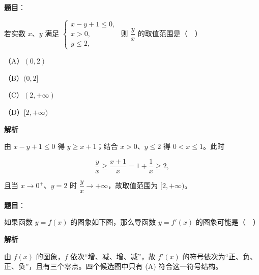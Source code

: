 \begin{answer}

\textbf{题目}：

若实数 $x$、$y$ 满足 $\begin{cases}x-y+1\leqslant0,\\ x>0,\\ y\leqslant2,\end{cases}$ 则 $\dfrac yx$ 的取值范围是（　）

（A）$(0,2)$

（B）$(0,2]$

（C）$(2,+\infty)$

（D）$[2,+\infty)$

\textbf{解析}

由 $x-y+1\leqslant0$ 得 $y\geqslant x+1$；结合 $x>0$、$y\leqslant2$ 得 $0<x\leqslant1$。此时

\nopagebreak[4]
\[\frac yx\geqslant\frac{x+1}x=1+\frac1x\geqslant2,\]

且当 $x\to0^+$、$y=2$ 时 $\dfrac yx\to+\infty$，故取值范围为 $[2,+\infty)$。


\end{answer}
\begin{answer}

\textbf{题目}：

如果函数 $y=f(x)$ 的图象如下图，那么导函数 $y=f'(x)$ 的图象可能是（　）
\nopagebreak[4]
\begin{center}\end{center}
\nopagebreak[4]
\textbf{解析}

由 $f(x)$ 的图象，$f$ 依次“增、减、增、减”，故 $f'(x)$ 的符号依次为“正、负、正、负”，且有三个零点。四个候选图中只有 (A) 符合这一符号结构。


\end{answer}
